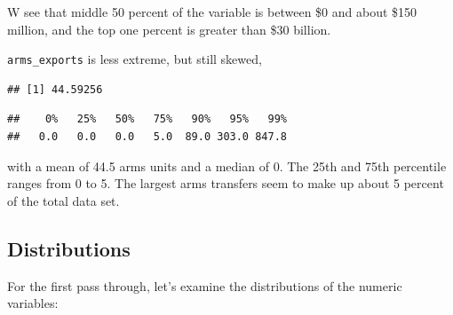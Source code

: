 \documentclass[11pt,]{article}
\newenvironment{Shaded}{\begin{snugshade}}{\end{snugshade}}
\newcommand{\DecValTok}[1]{\textcolor[rgb]{0.00,0.00,0.81}{#1}}
\newcommand{\FloatTok}[1]{\textcolor[rgb]{0.00,0.00,0.81}{#1}}
\newcommand{\KeywordTok}[1]{\textcolor[rgb]{0.13,0.29,0.53}{\textbf{#1}}}
\newcommand{\NormalTok}[1]{#1}
\newcommand{\OperatorTok}[1]{\textcolor[rgb]{0.81,0.36,0.00}{\textbf{#1}}}
\begin{document}
W see that middle 50 percent of the variable is between \$0 and about
\$150 million, and the top one percent is greater than \$30 billion.

\texttt{arms\_exports} is less extreme, but still skewed,

\begin{Shaded}
\end{Shaded}

\begin{verbatim}
## [1] 44.59256
\end{verbatim}

\begin{Shaded}
\end{Shaded}

\begin{verbatim}
##    0%   25%   50%   75%   90%   95%   99% 
##   0.0   0.0   0.0   5.0  89.0 303.0 847.8
\end{verbatim}

with a mean of 44.5 arms units and a median of 0. The 25th and 75th
percentile ranges from 0 to 5. The largest arms transfers seem to make
up about 5 percent of the total data set.

\hypertarget{distributions}{%
\subsection{Distributions}\label{distributions}}

For the first pass through, let's examine the distributions of the
numeric variables:
\end{document}
